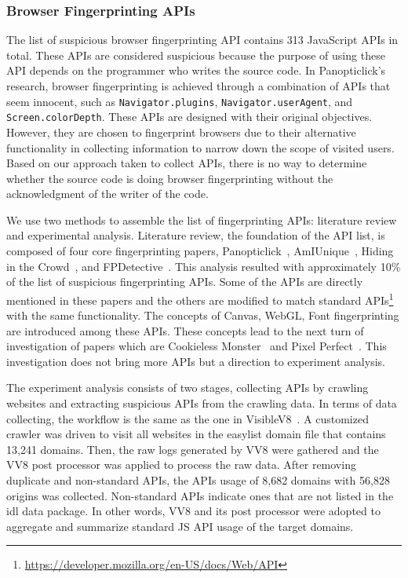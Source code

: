 \subsubsection{Browser Fingerprinting APIs}
\label{sec:fp-apis}

The list of suspicious browser fingerprinting API contains 313 JavaScript APIs in total. These APIs are considered suspicious because the purpose of using these API depends on the programmer who writes the source code. In Panopticlick's research, browser fingerprinting is achieved through a combination of APIs that seem innocent, such as \texttt{Navigator.plugins}, \texttt{Navigator.userAgent}, and \texttt{Screen.colorDepth}. These APIs are designed with their original objectives. However, they are chosen to fingerprint browsers due to their alternative functionality in collecting information to narrow down the scope of visited users. Based on our approach taken to collect APIs, there is no way to determine whether the source code is doing browser fingerprinting without the acknowledgment of the writer of the code. 

We use two methods to assemble the list of fingerprinting APIs: literature review and experimental analysis. Literature review, the foundation of the API list, is composed of four core fingerprinting papers, Panopticlick~\cite{panopticlick}, AmIUnique~\cite{amiunique}, Hiding in the Crowd~\cite{hidinginthecrowd}, and FPDetective~\cite{fpdetective}. This analysis resulted with approximately 10\% of the list of suspicious fingerprinting APIs. Some of the APIs are directly mentioned in these papers and the others are modified to match standard APIs\footnote{\url{https://developer.mozilla.org/en-US/docs/Web/API}} with the same functionality. The concepts of Canvas, WebGL, Font fingerprinting are introduced among these APIs. These concepts lead to the next turn of investigation of papers which are Cookieless Monster~\cite{cookiemonster-SP13} and Pixel Perfect~\cite{mowery2012pixel}. This investigation does not bring more APIs but a direction to experiment analysis. 

The experiment analysis consists of two stages, collecting APIs by crawling websites and extracting suspicious APIs from the crawling data. In terms of data collecting, the workflow is the same as the one in VisibleV8~\cite{vv8-imc19}. A customized crawler was driven to visit all websites in the easylist domain file that contains 13,241 domains. Then, the raw logs generated by VV8 were gathered and the VV8 post processor was applied to process the raw data. After removing duplicate and non-standard APIs, the APIs usage of 8,682 domains with 56,828 origins was collected. Non-standard APIs indicate ones that are not listed in the idl data package. In other words, VV8 and its post processor were adopted to aggregate and summarize standard JS API usage of the target domains.


